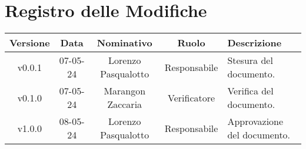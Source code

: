 \section*{\Large Registro delle Modifiche}
    \begin{table}[h]
        \centering
        \renewcommand\tabularxcolumn[1]{m{#1}} %
        \renewcommand{\arraystretch}{1.5}
        \begin{tabularx}{0.98\textwidth}
            {c|c|c|c|>{\centering\arraybackslash}X}
            \rowcolor{black}
            \textbf{\color{white} Versione} & \textbf{\color{white} Data} & \textbf{\color{white} Nominativo} & \textbf{\color{white} Ruolo} & \textbf{\color{white} Descrizione} \\ 
            \hline

            v0.0.1 & 07-05-24 & Lorenzo Pasqualotto & Responsabile & Stesura del documento. \\
            v0.1.0 & 07-05-24 & Marangon Zaccaria & Verificatore & Verifica del documento. \\
            v1.0.0 & 08-05-24 & Lorenzo Pasqualotto & Responsabile & Approvazione del documento.\\
            \hline
        \end{tabularx}
    \end{table}